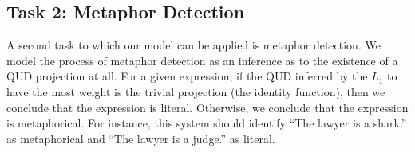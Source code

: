 \documentclass[10pt,letterpaper,twocolumn]{article}
\begin{document}






\subsection{Task 2: Metaphor Detection} \label{task2det}

A second task to which our model can be applied is metaphor detection. We model the process of metaphor detection as an inference as to the existence of a QUD projection at all. For a given expression, if the QUD inferred by the $L_1$ to have the most weight is the trivial projection (the identity function), then we conclude that the expression is literal. Otherwise, we conclude that the expression is metaphorical. For instance, this system should identify ``The lawyer is a shark.'' as metaphorical and ``The lawyer is a judge.'' as literal.
\end{document}
